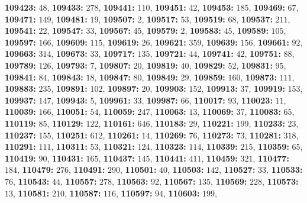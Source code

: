 \textsf{\bfseries 109423:} $48$, \textsf{\bfseries 109433:} $278$, \textsf{\bfseries 109441:} $110$, \textsf{\bfseries 109451:} $42$, \textsf{\bfseries 109453:} $185$, \textsf{\bfseries 109469:} $67$, \textsf{\bfseries 109471:} $149$, \textsf{\bfseries 109481:} $19$, \textsf{\bfseries 109507:} $2$, \textsf{\bfseries 109517:} $53$, \textsf{\bfseries 109519:} $68$, \textsf{\bfseries 109537:} $211$, \textsf{\bfseries 109541:} $22$, \textsf{\bfseries 109547:} $33$, \textsf{\bfseries 109567:} $45$, \textsf{\bfseries 109579:} $2$, \textsf{\bfseries 109583:} $45$, \textsf{\bfseries 109589:} $105$, \textsf{\bfseries 109597:} $166$, \textsf{\bfseries 109609:} $115$, \textsf{\bfseries 109619:} $26$, \textsf{\bfseries 109621:} $359$, \textsf{\bfseries 109639:} $156$, \textsf{\bfseries 109661:} $92$, \textsf{\bfseries 109663:} $314$, \textsf{\bfseries 109673:} $33$, \textsf{\bfseries 109717:} $135$, \textsf{\bfseries 109721:} $44$, \textsf{\bfseries 109741:} $42$, \textsf{\bfseries 109751:} $88$, \textsf{\bfseries 109789:} $126$, \textsf{\bfseries 109793:} $7$, \textsf{\bfseries 109807:} $20$, \textsf{\bfseries 109819:} $40$, \textsf{\bfseries 109829:} $52$, \textsf{\bfseries 109831:} $95$, \textsf{\bfseries 109841:} $84$, \textsf{\bfseries 109843:} $18$, \textsf{\bfseries 109847:} $80$, \textsf{\bfseries 109849:} $29$, \textsf{\bfseries 109859:} $160$, \textsf{\bfseries 109873:} $111$, \textsf{\bfseries 109883:} $235$, \textsf{\bfseries 109891:} $102$, \textsf{\bfseries 109897:} $20$, \textsf{\bfseries 109903:} $152$, \textsf{\bfseries 109913:} $37$, \textsf{\bfseries 109919:} $153$, \textsf{\bfseries 109937:} $147$, \textsf{\bfseries 109943:} $5$, \textsf{\bfseries 109961:} $33$, \textsf{\bfseries 109987:} $66$, \textsf{\bfseries 110017:} $93$, \textsf{\bfseries 110023:} $11$, \textsf{\bfseries 110039:} $166$, \textsf{\bfseries 110051:} $54$, \textsf{\bfseries 110059:} $247$, \textsf{\bfseries 110063:} $13$, \textsf{\bfseries 110069:} $37$, \textsf{\bfseries 110083:} $65$, \textsf{\bfseries 110119:} $85$, \textsf{\bfseries 110129:} $122$, \textsf{\bfseries 110161:} $646$, \textsf{\bfseries 110183:} $29$, \textsf{\bfseries 110221:} $199$, \textsf{\bfseries 110233:} $23$, \textsf{\bfseries 110237:} $155$, \textsf{\bfseries 110251:} $612$, \textsf{\bfseries 110261:} $14$, \textsf{\bfseries 110269:} $76$, \textsf{\bfseries 110273:} $73$, \textsf{\bfseries 110281:} $318$, \textsf{\bfseries 110291:} $111$, \textsf{\bfseries 110311:} $53$, \textsf{\bfseries 110321:} $124$, \textsf{\bfseries 110323:} $114$, \textsf{\bfseries 110339:} $215$, \textsf{\bfseries 110359:} $65$, \textsf{\bfseries 110419:} $90$, \textsf{\bfseries 110431:} $165$, \textsf{\bfseries 110437:} $145$, \textsf{\bfseries 110441:} $411$, \textsf{\bfseries 110459:} $321$, \textsf{\bfseries 110477:} $184$, \textsf{\bfseries 110479:} $276$, \textsf{\bfseries 110491:} $290$, \textsf{\bfseries 110501:} $40$, \textsf{\bfseries 110503:} $142$, \textsf{\bfseries 110527:} $33$, \textsf{\bfseries 110533:} $76$, \textsf{\bfseries 110543:} $44$, \textsf{\bfseries 110557:} $278$, \textsf{\bfseries 110563:} $92$, \textsf{\bfseries 110567:} $135$, \textsf{\bfseries 110569:} $228$, \textsf{\bfseries 110573:} $13$, \textsf{\bfseries 110581:} $210$, \textsf{\bfseries 110587:} $116$, \textsf{\bfseries 110597:} $94$, \textsf{\bfseries 110603:} $199$, 
